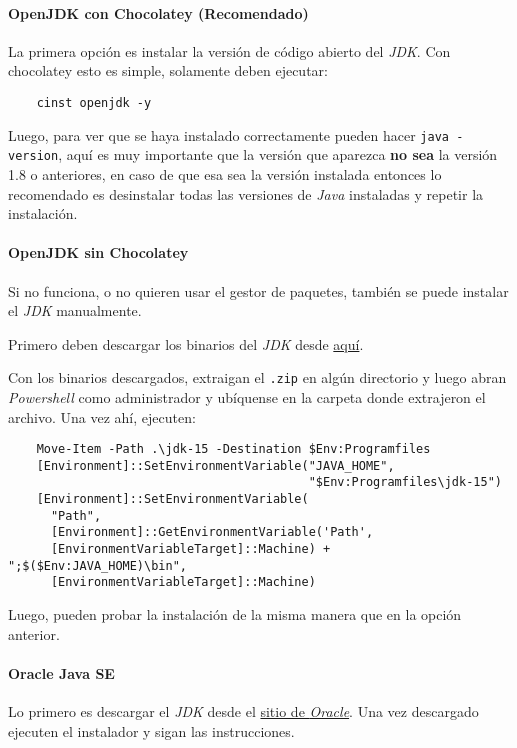 \paragraph{OpenJDK con Chocolatey (Recomendado)}
  La primera opción es instalar la versión de código abierto del \textit{JDK}.
  Con chocolatey esto es simple, solamente deben ejecutar:
  \begin{verbatim}
    cinst openjdk -y
  \end{verbatim}
  
  Luego, para ver que se haya instalado correctamente pueden hacer \texttt{java -version}, aquí es
  muy importante que la versión que aparezca \textbf{no sea} la versión 1.8 o anteriores, en caso 
  de que esa sea la versión instalada entonces lo recomendado es desinstalar todas las versiones
  de \textit{Java} instaladas y repetir la instalación.

\paragraph{OpenJDK sin Chocolatey}
  Si no funciona, o no quieren usar el gestor de paquetes, también se puede instalar el 
  \textit{JDK} manualmente.
  
  Primero deben descargar los binarios del \textit{JDK} desde 
  \href{
    https://download.java.net/java/GA/jdk15.0.2/0d1cfde4252546c6931946de8db48ee2/7/GPL/openjdk-15.0.2_windows-x64_bin.zip
    }{aquí}.
  
  Con los binarios descargados, extraigan el \texttt{.zip} en algún directorio y luego 
  abran \textit{Powershell} como administrador y ubíquense en la carpeta donde extrajeron el 
  archivo.
  Una vez ahí, ejecuten:

  \begin{verbatim}
    Move-Item -Path .\jdk-15 -Destination $Env:Programfiles
    [Environment]::SetEnvironmentVariable("JAVA_HOME", 
                                          "$Env:Programfiles\jdk-15")
    [Environment]::SetEnvironmentVariable(
      "Path", 
      [Environment]::GetEnvironmentVariable('Path', 
      [EnvironmentVariableTarget]::Machine) + ";$($Env:JAVA_HOME)\bin", 
      [EnvironmentVariableTarget]::Machine)
  \end{verbatim}

  Luego, pueden probar la instalación de la misma manera que en la opción anterior.

  \paragraph{Oracle Java SE}
    Lo primero es descargar el \textit{JDK} desde el 
    \href{
      https://www.oracle.com/java/technologies/javase-jdk15-downloads.html
    }{sitio de \textit{Oracle}}. 
    Una vez descargado ejecuten el instalador y sigan las instrucciones.

